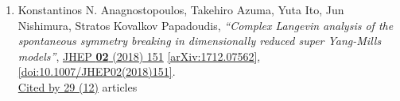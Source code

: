 \documentclass[a4paper,10pt]{article}
\begin{document}
\begin{enumerate}
\begin{enumerate}
\end{enumerate}
\item Konstantinos N. Anagnostopoulos, Takehiro Azuma, Yuta Ito, Jun Nishimura, Stratos Kovalkov Papadoudis, {\it ``Complex Langevin analysis of the spontaneous symmetry breaking in dimensionally reduced super Yang-Mills models''}, \href{https://www.doi.org/10.1007/JHEP02(2018)151}{JHEP {\bf 02} (2018) 151} \href{https://arxiv.org/abs/1712.07562}{[arXiv:1712.07562]}, \href{https://www.doi.org/10.1007/JHEP02(2018)151}{[doi:10.1007/JHEP02(2018)151]}.
\\\href{https://inspirehep.net/literature/?q=refersto%3Arecid%3A1644379}{Cited by 29 (12)} articles


\end{enumerate}
\end{document}
